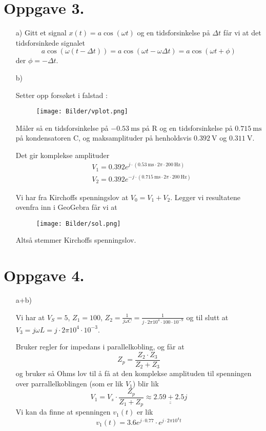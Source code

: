 \documentclass[a4paper,11pt,norsk]{article}
\begin{document}
\newpage
\section*{Oppgave 3.}
\begin{itemize}
    \item[a)] {
        Gitt et signal $x(t) = a \cos{\left(\omega t\right)}$ og en tidsforsinkelse på $\Delta t$ får vi at det tidsforsinkede signalet
        \[
            a \cos{\left(\omega (t - \Delta t)\right)} = a \cos{\left(\omega t - \omega \Delta t\right)} = a \cos{\left(\omega t + \phi\right)}
        \]
        der $\phi = -\Delta t$.
    }
    \item[b)] {
        Setter opp forsøket i falstad \cite{falstad}:
        \begin{figure}[H]
            \centering
            \texttt{[image: Bilder/vplot.png]}
        \end{figure}
        Måler så en tidsforsinkelse på $\SI{-0.53}{\milli\s}$ på R og en tidsforsinkelse på $\SI{0.715}{\milli\s}$ på
        kondensatoren C, og maksamplituder på henholdsvis $\SI{0.392}{\volt}$ og $\SI{0.311}{\volt}$. 
        
        Det gir komplekse amplituder
        \begin{align*}
            &V_1 = 0.392e^{j \cdot (\SI{0.53}{\milli\s} \cdot 2\pi \cdot \SI{200}{\hertz})} \\
            &V_2 =  0.392e^{-j \cdot (\SI{0.715}{\milli\s} \cdot 2\pi \cdot \SI{200}{\hertz})}
        \end{align*}

        Vi har fra Kirchoffs spenningslov at $V_0 = V_1 + V_2$. Legger vi resultatene ovenfra inn i GeoGebra får vi at 
        \begin{figure}[H]
            \centering
            \texttt{[image: Bilder/sol.png]}
        \end{figure}
        Altså stemmer Kirchoffs spenningslov.
    }
\end{itemize}

\section*{Oppgave 4.}
\begin{itemize}
    \item[a+b)] {
        Vi har at $V_S = 5$, $Z_1 = 100$, $Z_2 = \frac{1}{j\omega C} = \frac{1}{j \cdot 2\pi 10^4 \cdot 100 \cdot 10^{-9}}$ og til slutt at 
        $V_3 = j\omega L = j \cdot 2\pi 10^4 \cdot 10^{-3}$.

        Bruker regler for impedans i parallelkobling, og får at 
        \[
            Z_p = \frac{Z_2 \cdot Z_3}{Z_2 + Z_3}
        \]
        og bruker så Ohms lov til å få at den komplekse amplituden til spenningen over parrallelkoblingen (som er lik $V_1$) blir lik
        \[
            V_1 = V_s \cdot \frac{Z_p}{Z_1 + Z_p} \approx \underline{\underline{2.59 + 2.5j}}
        \]
        Vi kan da finne at spenningen $v_1(t)$ er lik
        \[
            v_1(t) = 3.6e^{j \cdot 0.77} \cdot e^{j \cdot 2\pi 10^4t}
        \]
    }
\end{itemize}

\newpage
{}
{}
\begin{thebibliography}{99}

\end{thebibliography}
\end{document}
